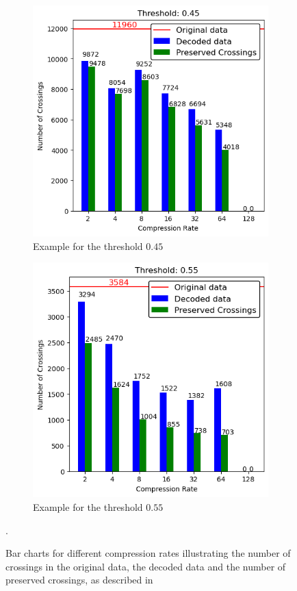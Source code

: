 \begin{figure}[h]
	\centering
	\begin{subfigure}{.5\textwidth}
		\centering
		\includegraphics[width=\linewidth]{../../Images/spikes_threshold_045.png}
		\caption{Example for the threshold $0.45$}
		\label{fig:DecodedBarChar1}
	\end{subfigure}\hfill 
	\begin{subfigure}{.5\textwidth}
		\centering
		\includegraphics[width=\linewidth]{../../Images/spikes_threshold_055.png}
		\caption{Example for the threshold $0.55$}
		\label{fig:DecodedBarChar2}
	\end{subfigure}
	\caption{Bar charts for different compression rates illustrating the number of crossings in the original data, the decoded data and the number of preserved crossings, as described in }.
	\label{fig:DecodedBarChar}
\end{figure}
